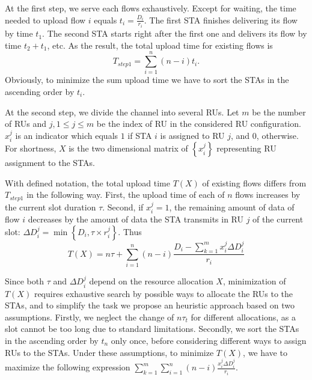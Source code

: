At the first step, we serve each flows exhaustively.
Except for waiting, the time needed to upload flow $i$ equals $t_i = \frac{D_i}{r_{i}}$. %
The first STA finishes delivering its flow by time $t_1$.
The second STA starts right after the first one and delivers its flow by time $t_2 + t_1$, etc.
As the result, the total upload time for existing flows is
\[ T_{step1} = \sum_{i = 1}^{n} \left(n - i\right) t_i. \]
Obviously, to minimize the sum upload time we have to sort the STAs in the ascending order by $t_i$.

At the second step, we divide the channel into several RUs.   
Let $m$ be the number of RUs and $j, 1\le j \le m$ be the index of RU in the considered RU configuration.  
$x_i^j$ is an indicator which equals $1$ if STA $i$ is assigned to RU $j$, and $0$, otherwise.
For shortness, $X$ is the two dimensional matrix of $\left\{x_i^j\right\}$ representing RU assignment to the STAs. 

With defined notation, the total upload time $T\left(X\right) $ of existing flows differs from $T_{step1}$ in the following way. First, the upload time of each of $n$ flows increases by  the current slot duration $\tau$. Second, if $x_i^j=1$, the remaining amount of data of flow $i$ decreases by the amount of data the STA transmits in RU $j$ of the current slot: $\Delta D_i^j = \min\left\{D_i, \tau \times r_{i}^{j}\right\}$. Thus  
\[ T\left(X\right) = n \tau + \sum_{i = 1}^{n} \left(n - i\right) \frac{D_i -  \sum_{k = 1}^{m} x_i^j \Delta D_i^j}{r_{i}} \]



Since both $\tau$ and  $\Delta D_i^j$ depend on the resource allocation $X$, minimization of $T(X)$ requires exhaustive search by possible ways to allocate the RUs to the STAs, and to simplify the task we propose an heuristic approach based on two assumptions.
Firstly, we neglect the change of $n \tau_t$ for different allocations, as a slot cannot be too long due to standard limitations.
Secondly, we sort the STAs in the ascending order by $t_n$ only once, before considering different ways to assign RUs to the STAs.
Under these assumptions, to minimize  $T(X)$, we have to maximize the following expression $\sum_{k = 1}^{m} \sum_{i = 1}^{n } \left(n - i\right) \frac{x_i^j \Delta D_i^j}{r_{i}}$.

